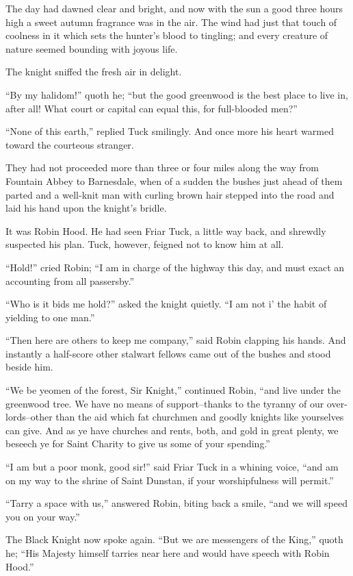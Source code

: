 The day had dawned clear and bright, and now with the sun a good three
hours high a sweet autumn fragrance was in the air. The wind had just
that touch of coolness in it which sets the hunter's blood to tingling;
and every creature of nature seemed bounding with joyous life.

The knight sniffed the fresh air in delight.

``By my halidom!'' quoth he; ``but the good greenwood is the best place
to live in, after all! What court or capital can equal this, for
full-blooded men?''

``None of this earth,'' replied Tuck smilingly. And once more his heart
warmed toward the courteous stranger.

They had not proceeded more than three or four miles along the way from
Fountain Abbey to Barnesdale, when of a sudden the bushes just ahead of
them parted and a well-knit man with curling brown hair stepped into the
road and laid his hand upon the knight's bridle.

It was Robin Hood. He had seen Friar Tuck, a little way back, and
shrewdly suspected his plan. Tuck, however, feigned not to know him at
all.

``Hold!'' cried Robin; ``I am in charge of the highway this day, and
must exact an accounting from all passersby.''

``Who is it bids me hold?'' asked the knight quietly. ``I am not i' the
habit of yielding to one man.''

``Then here are others to keep me company,'' said Robin clapping his
hands. And instantly a half-score other stalwart fellows came out of the
bushes and stood beside him.

``We be yeomen of the forest, Sir Knight,'' continued Robin, ``and live
under the greenwood tree. We have no means of support--thanks to the
tyranny of our over-lords--other than the aid which fat churchmen and
goodly knights like yourselves can give. And as ye have churches and
rents, both, and gold in great plenty, we beseech ye for Saint Charity
to give us some of your spending.''

``I am but a poor monk, good sir!'' said Friar Tuck in a whining voice,
``and am on my way to the shrine of Saint Dunstan, if your
worshipfulness will permit.''

``Tarry a space with us,'' answered Robin, biting back a smile, ``and we
will speed you on your way.''

The Black Knight now spoke again. ``But we are messengers of the King,''
quoth he; ``His Majesty himself tarries near here and would have speech
with Robin Hood.''

